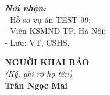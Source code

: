 \documentclass[12pt,a4paper]{article}
\begin{document}
\noindent
\begin{minipage}[t]{0.45\textwidth}
    \small
    \textbf{\textit{Nơi nhận:}}\\
    - Hồ sơ vụ án TEST-99;\\
    - Viện KSMND TP. Hà Nội;\\
    - Lưu: VT, CSHS.
\end{minipage}
\hfill
\begin{minipage}[t]{0.5\textwidth}
    \begin{center}
        \small
        \textbf{NGƯỜI KHAI BÁO}\\
        \textit{(Ký, ghi rõ họ tên)}\\[1.5cm]
        \textbf{Trần Ngọc Mai}
    \end{center}
\end{minipage}
\end{document}
